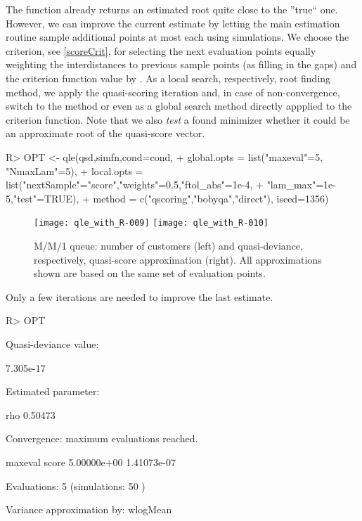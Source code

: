 \documentclass[article, nojss]{jss}
\numberwithin{equation}{section}			%
\begin{document}
%
The function already returns an estimated root quite close to the
''true`` one. However, we can improve the current estimate by letting the main
estimation routine  sample  additional points at most
each using  simulations. We choose the  criterion, see
\eqref{scoreCrit}, for selecting the next evaluation points equally weighting
the interdistances to previous sample points (as filling in the gaps) and the
criterion function value by . As a local search, respectively,
root finding method, we apply the quasi-scoring iteration and, in case of non-convergence,
switch to the method  or even  as a global search
method directly appplied to the criterion function. Note that we also
\emph{test} a found minimizer whether it could be an approximate root of the
quasi-score vector.
\begin{Schunk}
\begin{Sinput}
R> OPT <- qle(qsd,simfn,cond=cond,	     	
+   global.opts = list("maxeval"=5, "NmaxLam"=5),
+   local.opts = list("nextSample"="score","weights"=0.5,"ftol_abs"=1e-4,
+                     "lam_max"=1e-5,"test"=TRUE),
+   method = c("qscoring","bobyqa","direct"), iseed=1356) 
\end{Sinput}
\end{Schunk}
%
\begin{figure}[ht!]
\texttt{[image: qle\_with\_R-009]}
\texttt{[image: qle\_with\_R-010]}
\caption{M/M/1 queue: number of customers (left) and
quasi-deviance, respectively, quasi-score approximation (right). All
approximations shown are based on the same set of evaluation
points.}\label{fig:mm1q1}
\end{figure}
Only a few iterations are needed to improve the last estimate.
\begin{Schunk}
\begin{Sinput}
R> OPT
\end{Sinput}
\begin{Soutput}
Quasi-deviance value: 

 7.305e-17 

Estimated parameter:

    rho    
0.50473    

Convergence: maximum evaluations reached.

    maxeval        score  
5.00000e+00  1.41073e-07  

Evaluations:  5  (simulations:  50 )

Variance approximation by:  wlogMean 
\end{Soutput}
\end{Schunk}
\end{document}

